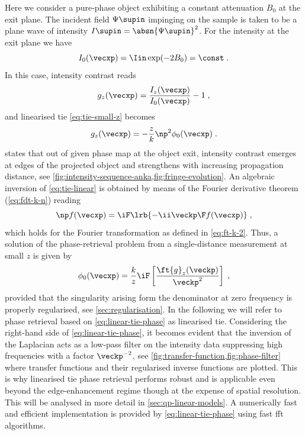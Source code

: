 \documentclass[
twoside,
openright,
titlepage,
numbers=noenddot,
headinclude,
fleqn,
a4paper,
footinclude=true,
cleardoublepage=empty,
abstractoff,
BCOR=5mm,
paper=a4,
fontsize=11pt,
british,ngerman,american,
]{scrreprt}
\begin{document}
Here we consider a pure-phase object exhibiting a constant attenuation
$B_0$ at the exit plane.  The incident field $\Psi\supin$ impinging on
the sample is taken to be a plane wave of intensity
$I\supin=\absn{\Psi\supin}^2$.  For the intensity  at the exit plane
we have
\begin{equation}
  \label{eq:exit-intensity}
  I_0(\vecxp) = \Iin\exp(-2 B_0)  =\const \;.
\end{equation}
In this case,  intensity contrast reads 
\begin{equation}
  \label{eq:g-pure-phase}
   g_z(\vecxp) = \frac{I_z(\vecxp)}{I_{0}(\vecxp)}-1 \;,
\end{equation}
and  linearised \ac{tie} \eqref{eq:tie-small-z} becomes
\cite{Bremmer1952}
\begin{equation}
  \label{eq:tie-linear}
  g_z(\vecxp)=-\frac{z}{k}\np^2\phi_0(\vecxp)\;.
\end{equation}
 states that out of given phase map at the object
exit, intensity contrast emerges at edges of the projected object and
strengthens with increasing propagation distance, see 
\cref{fig:intensity-sequence-anka,fig:fringe-evolution}.  An algebraic
inversion of \cref{eq:tie-linear} is obtained by means of the Fourier
derivative theorem (\cref{eq:fdt-k-n}) reading
\begin{equation}
  \label{eq:fourier-derivative}
  \np f(\vecxp) = \iF\lrb{ -\ii\veckp \F f(\vecxp) } \;,
\end{equation}
which holds for the Fourier transformation as defined in
\cref{eq:ft-k-2}.  Thus, a solution of the phase-retrieval problem
from a single-distance measurement at small $z$ is given by
\begin{equation}
  \label{eq:linear-tie-phase}
  \phi_0(\vecxp) = 
  \frac{k}{z} \iF\left[\frac{\ft{g}_z(\veckp)}{\veckp^{2}}\right] \;,
\end{equation}
provided that the singularity arising form the denominator at zero
frequency is properly regularised, see \cref{sec:regularisation}.  In
the following we will refer to phase retrieval based on
\cref{eq:linear-tie-phase} as linearised \ac{tie}.  Considering the
right-hand side of \cref{eq:linear-tie-phase}, it becomes evident that
the inversion of the Laplacian acts as a low-pass filter on the
intensity data suppressing high frequencies with a factor
$\veckp^{-2}$, see \cref{fig:transfer-function,fig:phase-filter} where
transfer functions and their regularised inverse functions are
plotted.  This is why linearised \ac{tie} phase retrieval performs
robust and is applicable even beyond the edge-enhancement regime
though at the expense of spatial resolution.  This will be analysed in
more detail in \cref{sec:qp-linear-models}.
A numerically fast and efficient implementation is provided by
\cref{eq:linear-tie-phase} using fast \ac{fft}
algorithms.
\end{document}
